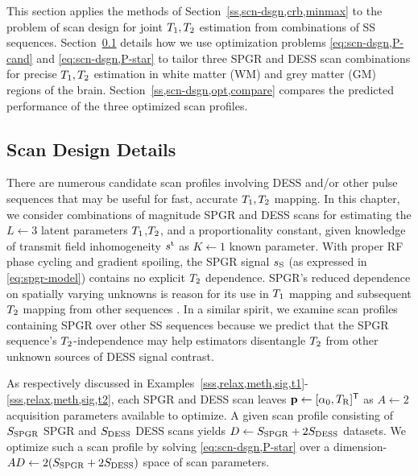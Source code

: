 This section applies the methods 
of Section~\ref{ss,scn-dsgn,crb,minmax} 
to the problem of scan design 
for joint $T_1,T_2$ estimation 
from combinations of SS sequences. 
Section~\ref{ss,scn-dsgn,opt,design} details 
how we use optimization problems
\eqref{eq:scn-dsgn,P-cand} and \eqref{eq:scn-dsgn,P-star} 
to tailor three SPGR and DESS scan combinations
for precise $T_1,T_2$ estimation 
in white matter (WM) and grey matter (GM) regions 
of the brain. 
Section~\ref{ss,scn-dsgn,opt,compare} compares the predicted performance 
of the three optimized scan profiles.

\subsection{Scan Design Details}
\label{ss,scn-dsgn,opt,design}

There are numerous candidate scan profiles
involving DESS and/or other pulse sequences
that may be useful
for fast, accurate $T_1,T_2$ mapping.
In this chapter,
we consider combinations
of magnitude SPGR and DESS scans
for estimating the $L\gets3$ latent parameters
$T_1$,$T_2$, and a proportionality constant,
given knowledge 
of transmit field inhomogeneity $s^{\mathrm{t}}$
as $K \gets 1$ known parameter.
With proper RF phase cycling
and gradient spoiling,
the SPGR signal $s_{\mathrm{S}}$
(as expressed in \eqref{eq:spgr-model})
contains no explicit $T_2$ dependence.
SPGR's reduced dependence
on spatially varying unknowns
is reason for its use in $T_1$ mapping
\cite{fram:87:rco, chang:08:lls, wang:12:srt}
and subsequent $T_2$ mapping
from other sequences
\cite{deoni:03:rct, nataraj:14:mbe}.
In a similar spirit, 
we examine scan profiles containing SPGR 
over other SS sequences because we predict 
that the SPGR sequence's $T_2$-independence 
may help estimators disentangle $T_2$ 
from other unknown sources of DESS signal contrast.

As respectively discussed
in Examples~\ref{sss,relax,meth,sig,t1}-\ref{sss,relax,meth,sig,t2},
each SPGR and DESS scan leaves 
$\mathbf{p} \gets [\alpha_0, T_\mathrm{R}]^{\mathsf{T}}$
as $A \gets 2$ acquisition parameters
available to optimize.
A given scan profile consisting 
of $S_{\mathrm{SPGR}}$ SPGR and $S_{\mathrm{DESS}}$ DESS scans 
yields $D \gets S_{\mathrm{SPGR}} + 2S_{\mathrm{DESS}}$ datasets. 
We optimize such a scan profile 
by solving \eqref{eq:scn-dsgn,P-star} 
over a dimension-$AD \gets 2(S_{\mathrm{SPGR}} + 2S_{\mathrm{DESS}})$ space 
of scan parameters.

